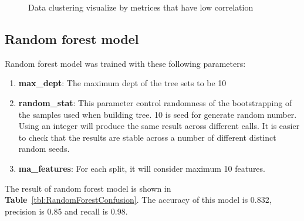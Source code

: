 \documentclass[12pt,oneside,openright,a4paper]{cpe-english-project}
\begin{document}
\begin{figure}[!h]\centering
    \setlength{\fboxrule}{0mm} %
    \setlength{\fboxsep}{0cm}
    \caption{Data clustering visualize by metrices that have low correlation}\label{fig:lowcorr}
\end{figure}

\subsection{Random forest model}  

\hspace{10mm}Random forest model was trained with these following parameters: 

\begin{enumerate}
  \item \textbf{max\_dept}: The maximum dept of the tree sets to be 10
  \item \textbf{random\_stat}: This parameter control randomness of the bootstrapping of the samples used when building tree. 10 is seed for generate random number. Using an integer will produce the same result across different calls. It is easier to check that the results are stable across a number of different distinct random seeds.
  \item \textbf{ma\_features}: For each split, it will consider maximum 10 features.
\end{enumerate}
\hspace{10mm}The result of random forest model is shown in \textbf{Table}~\ref{tbl:RandomForestConfusion}. The accuracy of this model is 0.832, precision is 0.85 and recall is 0.98.
\end{document}
